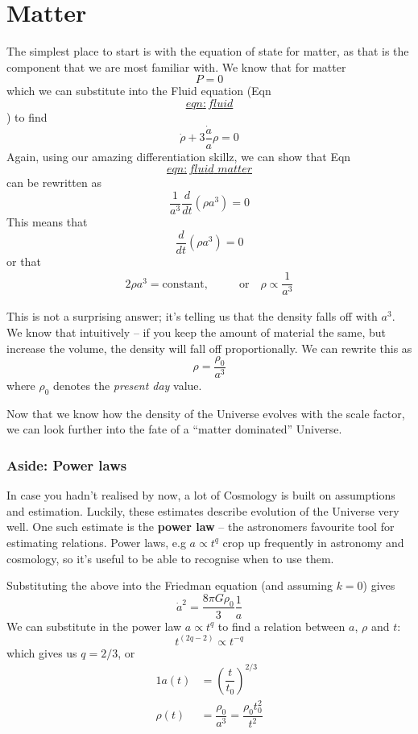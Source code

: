 \documentclass[]{book}
\begin{document}
\hypertarget{sec:matter_eos}{%
\section{Matter}\label{sec:matter_eos}}

The simplest place to start is with the equation of state for matter, as
that is the component that we are most familiar with. We know that for
matter \[P = 0\] which we can substitute into the Fluid equation
(Eqn~\protect\hyperlink{eqn:fluid}{\[eqn:fluid\]}) to find \[\label{eqn:fluid_matter}
    \dot{\rho} + 3\dfrac{\dot{a}}{a}\rho = 0\] Again, using our amazing
differentiation skillz, we can show that
Eqn~\protect\hyperlink{eqn:fluid_matter}{\[eqn:fluid\_matter\]} can be rewritten as
\[\dfrac{1}{a^3}\dfrac{d}{dt}\left(\rho a^3\right) = 0\] This means that
\[\dfrac{d}{dt}\left(\rho a^3\right) = 0\] or that \[\begin{aligned}
{2}
    \rho a^3 = \text{constant,} &\qquad\text{or}\quad \rho \propto \dfrac{1}{a^3}\end{aligned}\]

This is not a surprising answer; it's telling us that the density falls
off with \(a^3\). We know that intuitively -- if you keep the amount of
material the same, but increase the volume, the density will fall off
proportionally. We can rewrite this as \[\rho = \dfrac{\rho_0}{a^3}\]
where \(\rho_0\) denotes the \emph{present day} value.

Now that we know how the density of the Universe evolves with the scale
factor, we can look further into the fate of a ``matter dominated''
Universe.

\hypertarget{aside-power-laws}{%
\subsubsection*{Aside: Power laws}\label{aside-power-laws}}

In case you hadn't realised by now, a lot of Cosmology is built on
assumptions and estimation. Luckily, these estimates describe evolution
of the Universe very well. One such estimate is the \textbf{power law} -- the
astronomers favourite tool for estimating relations. Power laws, e.g
\(a \propto t^q\) crop up frequently in astronomy and cosmology, so it's
useful to be able to recognise when to use them.

Substituting the above into the Friedman equation (and assuming \(k=0\))
gives \[\dot{a}^2 = \dfrac{8\pi G \rho_0}{3}\dfrac{1}{a}\] We can
substitute in the power law \(a \propto t^q\) to find a relation between
\(a\), \(\rho\) and \(t\): \[t^{(2q-2)} \propto t^{-q}\] which gives us
\(q = 2/3\), or \[\begin{aligned}
{1}
    a(t) &= \left(\dfrac{t}{t_0}\right)^{2/3}\\
    \rho(t) &= \dfrac{\rho_0}{a^3} = \dfrac{\rho_0 t_{0}^{2}}{t^2}\end{aligned}\]
\end{document}

